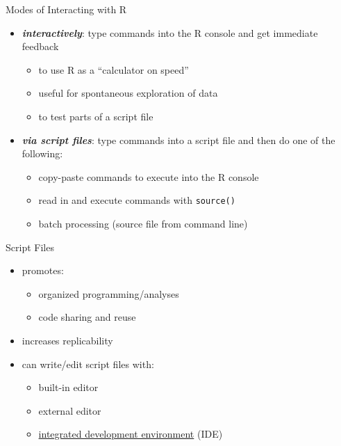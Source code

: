 \documentclass[t,12pt]{beamer}
\begin{document}

\begin{frame}{Modes of Interacting with R}

\begin{itemize}
   \item \textit{\textbf{interactively}}: type commands into the R console and get immediate feedback
   \begin{itemize}
      \item to use R as a ``calculator on speed''
      \item useful for spontaneous exploration of data
      \item to test parts of a script file
   \end{itemize}
   \item \textit{\textbf{via script files}}: type commands into a script file and then do one of the following:
   \begin{itemize}
      \item copy-paste commands to execute into the R console
      \item read in and execute commands with \texttt{source()}
      \item batch processing (source file from command line)
   \end{itemize}
\end{itemize}

\end{frame}


\begin{frame}{Script Files}

\begin{itemize}
   \item promotes:
   \begin{itemize}
      \item organized programming/analyses
      \item code sharing and reuse
   \end{itemize}
   \item increases replicability
   \item can write/edit script files with:
   \begin{itemize}
      \item built-in editor
      \item external editor
      \item \href{https://en.wikipedia.org/wiki/Integrated_development_environment}{integrated development environment} (IDE)
   \end{itemize}
\end{itemize}

\end{frame}
\end{document}
